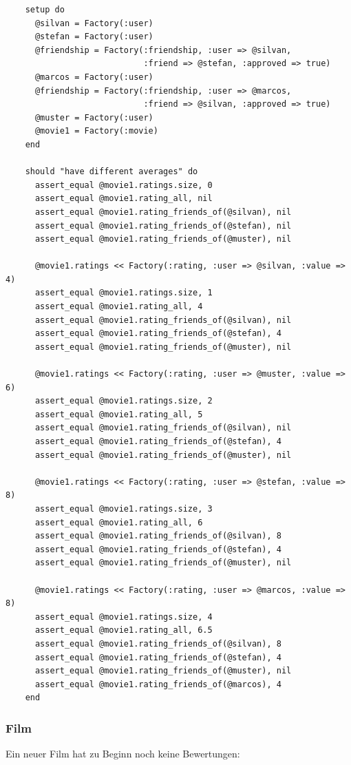 \begin{verbatim}
    setup do 
      @silvan = Factory(:user)
      @stefan = Factory(:user)
      @friendship = Factory(:friendship, :user => @silvan, 
                            :friend => @stefan, :approved => true)
      @marcos = Factory(:user)
      @friendship = Factory(:friendship, :user => @marcos, 
                            :friend => @silvan, :approved => true)
      @muster = Factory(:user)
      @movie1 = Factory(:movie)
    end
    
    should "have different averages" do
      assert_equal @movie1.ratings.size, 0
      assert_equal @movie1.rating_all, nil
      assert_equal @movie1.rating_friends_of(@silvan), nil 
      assert_equal @movie1.rating_friends_of(@stefan), nil 
      assert_equal @movie1.rating_friends_of(@muster), nil 
      
      @movie1.ratings << Factory(:rating, :user => @silvan, :value => 4)
      assert_equal @movie1.ratings.size, 1
      assert_equal @movie1.rating_all, 4
      assert_equal @movie1.rating_friends_of(@silvan), nil 
      assert_equal @movie1.rating_friends_of(@stefan), 4 
      assert_equal @movie1.rating_friends_of(@muster), nil
      
      @movie1.ratings << Factory(:rating, :user => @muster, :value => 6)
      assert_equal @movie1.ratings.size, 2
      assert_equal @movie1.rating_all, 5
      assert_equal @movie1.rating_friends_of(@silvan), nil 
      assert_equal @movie1.rating_friends_of(@stefan), 4 
      assert_equal @movie1.rating_friends_of(@muster), nil
      
      @movie1.ratings << Factory(:rating, :user => @stefan, :value => 8)
      assert_equal @movie1.ratings.size, 3
      assert_equal @movie1.rating_all, 6
      assert_equal @movie1.rating_friends_of(@silvan), 8 
      assert_equal @movie1.rating_friends_of(@stefan), 4 
      assert_equal @movie1.rating_friends_of(@muster), nil
      
      @movie1.ratings << Factory(:rating, :user => @marcos, :value => 8)
      assert_equal @movie1.ratings.size, 4
      assert_equal @movie1.rating_all, 6.5
      assert_equal @movie1.rating_friends_of(@silvan), 8
      assert_equal @movie1.rating_friends_of(@stefan), 4 
      assert_equal @movie1.rating_friends_of(@muster), nil
      assert_equal @movie1.rating_friends_of(@marcos), 4
    end
\end{verbatim}

\subsubsection{Film}
Ein neuer Film hat zu Beginn noch keine Bewertungen:


